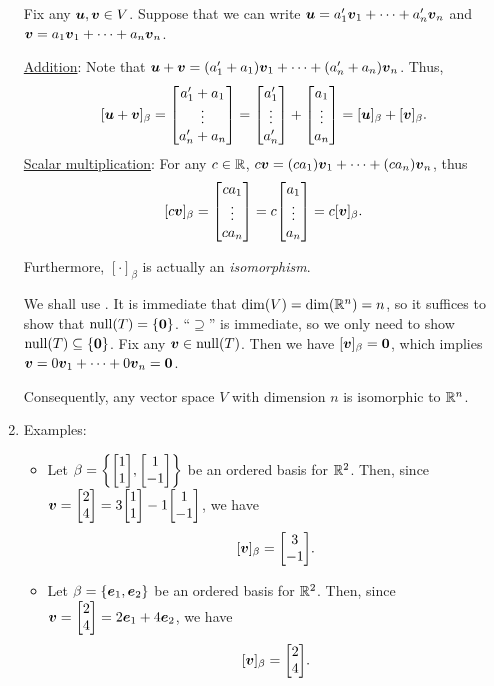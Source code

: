 \begin{enumerate}
\begin{pf}
Fix any \(\vb*{u},\vb*{v}\in V\). Suppose that we can write
\(\vb*{u}=a_1'\vb*{v}_1+\dotsb+a_n'\vb*{v}_n\) and
\(\vb*{v}=a_1\vb*{v}_1+\dotsb+a_n\vb*{v}_n\).

\underline{Addition}: Note that
\(\vb*{u}+\vb*{v}=(a_1'+a_1)\vb*{v}_1+\dotsb+(a_n'+a_n)\vb*{v}_n\). Thus,
\[
[\vect{u}+\vect{v}]_{\beta}
=\mqty[
a_1'+a_1\\
\vdots\\
a_n'+a_n
]
=\mqty[
a_1'\\ \vdots\\ a_n'
]
+\mqty[
a_1\\ \vdots\\ a_n
]
=[\vect{u}]_{\beta}+[\vect{v}]_{\beta}.
\]
\underline{Scalar multiplication}: For any \(c\in\mathbb{R}\),
\(c\vb*{v}=(ca_1)\vb*{v}_1+\dotsb+(ca_n)\vb*{v}_n\), thus
\[
[c\vect{v}]_{\beta}=\mqty[ca_1\\ \vdots\\ ca_n]=c\mqty[a_1\\ \vdots\\ a_n]=c[\vect{v}]_{\beta}.
\]
\end{pf}

Furthermore, \([\cdot]_{\beta}\) is actually an
\emph{isomorphism}.

\begin{pf}
We shall use . It is immediate that
\(\dim(V)=\dim(\mathbb{R}^n)=n\), so it suffices to show that \(\operatorname{null}(T)=\{\vb*{0}\}\).
``\(\supseteq\)'' is immediate, so we only need to show \(\operatorname{null}(T)\subseteq
\{\vb*{0}\}\). Fix any \(\vb*{v}\in\operatorname{null}(T)\). Then we have
\([\vb*{v}]_{\beta}=\vb*{0}\), which implies
\(\vb*{v}=0\vb*{v}_1+\dotsb+0\vb*{v}_n=\vb*{0}\).
\end{pf}

Consequently, any vector space \(V\) with dimension \(n\) is isomorphic to
\(\mathbb{R}^n\).

\item Examples:
\begin{itemize}
\item Let \(\beta=\qty{\mqty[1\\ 1], \mqty[1\\ -1]}\) be an ordered basis for
\(\mathbb{R}^2\). Then, since \(\vect{v}=\mqty[2\\4] =3\mqty[1\\ 1]-1\mqty[1\\ -1]\), we have
\[
[\vect{v}]_{\beta}=\mqty[3\\ -1].
\]
\item Let \(\beta=\{\vb*{e}_1,\vb*{e}_2\}\) be an ordered basis for
\(\mathbb{R}^2\). Then, since \(\vect{v}=\mqty[2\\ 4]=2\vect{e}_1+4\vect{e}_2\), we have
\[
[\vect{v}]_{\beta}=\mqty[2\\ 4].
\]


\end{itemize}
\end{enumerate}
